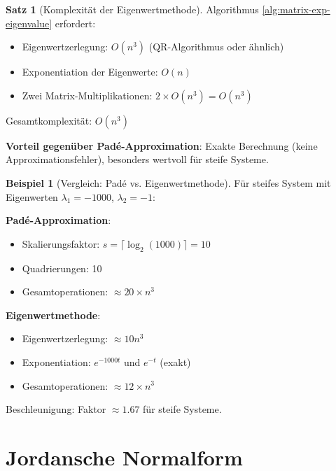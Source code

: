 ﻿\documentclass[a4paper,12pt]{report}
\theoremstyle{definition}
\newtheorem{beispiel}{Beispiel}
\newtheorem{satz}{Satz}
\begin{document}
	\begin{satz}[Komplexität der Eigenwertmethode]
		Algorithmus \ref{alg:matrix-exp-eigenvalue} erfordert:
		\begin{itemize}
			\item Eigenwertzerlegung: $O(n^3)$ (QR-Algorithmus oder ähnlich)
			\item Exponentiation der Eigenwerte: $O(n)$
			\item Zwei Matrix-Multiplikationen: $2 \times O(n^3) = O(n^3)$
		\end{itemize}
		
		Gesamtkomplexität: $O(n^3)$
		
		\textbf{Vorteil gegenüber Padé-Approximation}: Exakte Berechnung (keine Approximationsfehler), besonders wertvoll für steife Systeme.
	\end{satz}
	
	\begin{beispiel}[Vergleich: Padé vs. Eigenwertmethode]
		Für steifes System mit Eigenwerten $\lambda_1 = -1000$, $\lambda_2 = -1$:
		
		\textbf{Padé-Approximation}:
		\begin{itemize}
			\item Skalierungsfaktor: $s = \lceil \log_2(1000) \rceil = 10$
			\item Quadrierungen: 10
			\item Gesamtoperationen: $\approx 20 \times n^3$
		\end{itemize}
		
		\textbf{Eigenwertmethode}:
		\begin{itemize}
			\item Eigenwertzerlegung: $\approx 10 n^3$
			\item Exponentiation: $e^{-1000t}$ und $e^{-t}$ (exakt)
			\item Gesamtoperationen: $\approx 12 \times n^3$
		\end{itemize}
		
		Beschleunigung: Faktor $\approx 1.67$ für steife Systeme.
	\end{beispiel}
	
	\section{Jordansche Normalform}
	
\end{document}
